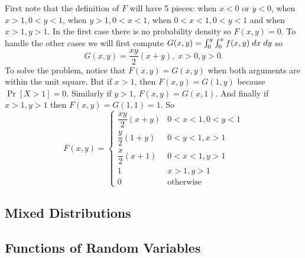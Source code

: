 \documentclass[../main.tex]{subfiles}
\begin{document}
\begin{solution}
First note that the definition of $F$ will have 5 pieces: when $x<0$ or $y<0$, when $x>1,0<y<1$,
when $y>1, 0<x<1$, when $0<x<1, 0<y<1$ and when $x>1,y>1$. In the first case there is no probability density so $F(x,y) = 0$. To handle the other cases we will first compute $G(x,y)
 = \int_0^y\int_0^x f(x,y) \;dx \;dy$ so
 $$G(x,y) = \dfrac{xy}{2}(x+y), \; x>0, y>0.$$
 To solve the problem, notice that $F(x,y) = G(x,y)$ when both arguments are within the unit square. But if $x>1$, then $F(x,y) = G(1,y)$ because $\Pr[X>1] = 0$. Similarly if $y>1$,
 $F(x,y) = G(x,1)$. And finally if $x>1,y>1$ then $F(x,y) = G(1,1) = 1$. So
 $$F(x,y) = 
    \begin{cases}
        \dfrac{xy}{2}(x+y) & 0<x<1, 0<y<1 \\[4ex]
        \dfrac{y}{2}(1+y) & 0<y<1, x>1 \\[4ex]
        \dfrac{x}{2}(x+1) & 0<x<1, y>1 \\[4ex]
        1 & x>1, y>1 \\
        0 & \mbox {otherwise}
    \end{cases}$$
\end{solution}
\subsection{Mixed Distributions}
\subsection{Functions of Random Variables}
\end{document}
